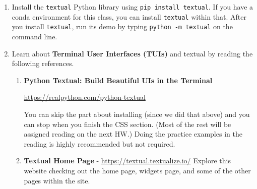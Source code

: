 \documentclass[12pt]{article}
\begin{document}
	\begin{enumerate}[resume]
		\item Install the \texttt{textual} Python library using \texttt{pip install textual}. If you have a conda environment for this class, you can install \texttt{textual} within that. After you install \texttt{textual}, run its demo by typing \texttt{python -m textual} on the command line.
		
		\item Learn about \textbf{Terminal User Interfaces (TUIs)} and textual by reading the following references.
		\begin{enumerate}
			\item \textbf{Python Textual: Build Beautiful UIs in the Terminal} 
			 \begin{center}
				\href{https://realpython.com/python-textual}{https://realpython.com/python-textual}
			\end{center}
			 You can skip the part about installing (since we did that above) and you can stop when you finish the CSS section. (Most of the rest will be assigned reading on the next HW.) Doing the practice examples in the reading is highly recommended but not required.
			 
			 \item \textbf{Textual Home Page} - 	 			 	\href{https://textual.textualize.io/}{https://textual.textualize.io/} \quad Explore this website checking out the home page, widgets page, and some of the other pages within the site.


		\end{enumerate}
	\end{enumerate}
\end{document}
